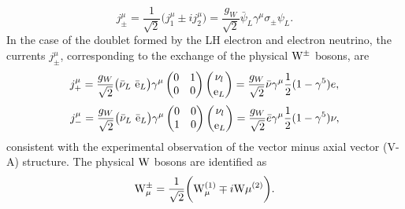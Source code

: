 \begin{equation}
\label{eqn:WeakCurrent2}
j_{\pm}^{\mu}=\frac{1}{\sqrt{2}}\bigg(j_{1}^{\mu}\pm ij_{2}^{\mu}\bigg)=\frac{g_{W}}{\sqrt{2}}\bar{\psi}_{L}\gamma^{\mu}\sigma_{\pm}\psi_{L}.
\end{equation}
In the case of the doublet formed by the LH electron and electron neutrino, the currents $j_{\pm}^{\mu}$, corresponding to the exchange of the physical $\mathrm{W}^{\pm}$ bosons, are
\begin{equation}
\label{eqn:WeakCurrent3}
j_{+}^{\mu}=\frac{g_{W}}{\sqrt{2}} \big(\bar{\nu}_{L}\ \bar{\Pe}_{L}\big) \gamma^{\mu} \begin{pmatrix}
  0 & 1 \\
  0 & 0 
 \end{pmatrix}
 \binom{\nu_{l}}{\Pe_{L}} = \frac{g_{W}}{\sqrt{2}}\bar{\nu}\gamma^{\mu} \frac{1}{2}(1-\gamma^{5})e,
\end{equation}
\begin{equation}
\label{eqn:WeakCurrent4}
j_{-}^{\mu}=\frac{g_{W}}{\sqrt{2}} \big(\bar{\nu}_{L}\ \bar{\Pe}_{L}\big) \gamma^{\mu} \begin{pmatrix}
  0 & 0 \\
  1 & 0 
 \end{pmatrix}
 \binom{\nu_{l}}{\Pe_{L}} = \frac{g_{W}}{\sqrt{2}}\bar{e}\gamma^{\mu} \frac{1}{2}(1-\gamma^{5})\nu,
\end{equation}
consistent with the experimental observation of the vector minus axial vector (V-A) structure.
The physical $\mathrm{W}$ bosons are identified as
\begin{equation}
\label{eqn:Wboson}
\mathrm{W}^{\pm}_{\mu}=\frac{1}{\sqrt{2}}\bigg(\mathrm{W}_{\mu}^{(1)}\mp i\mathrm{W}{\mu}^{(2)}\bigg).
\end{equation}

